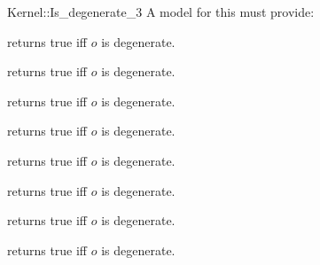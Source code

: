 \begin{ccRefFunctionObjectConcept}{Kernel::Is_degenerate_3}
A model for this must provide:


{returns true iff $o$ is degenerate.}

{returns true iff $o$ is degenerate.}

{returns true iff $o$ is degenerate.}

{returns true iff $o$ is degenerate.}

{returns true iff $o$ is degenerate.}

{returns true iff $o$ is degenerate.}

{returns true iff $o$ is degenerate.}

{returns true iff $o$ is degenerate.}

\ccIsModel{}

\end{ccRefFunctionObjectConcept}

